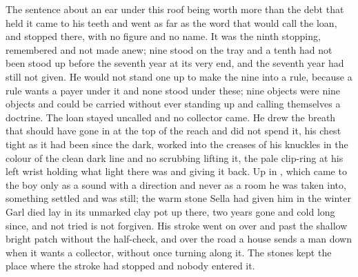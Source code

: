 The sentence about an ear under this roof being worth more than the debt that held it came to his teeth and went as far as the word that would call the loan, and stopped there, with no figure and no name. It was the ninth stopping, remembered and not made anew; nine stood on the tray and a tenth had not been stood up before the seventh year at its very end, and the seventh year had still not given. He would not stand one up to make the nine into a rule, because a rule wants a payer under it and none stood under these; nine objects were nine objects and could be carried without ever standing up and calling themselves a doctrine. The loan stayed uncalled and no collector came. He drew the breath that should have gone in at the top of the reach and did not spend it, his chest tight as it had been since the dark,  worked into the creases of his knuckles in the colour of the clean dark line and no scrubbing lifting it, the pale clip-ring at his left wrist holding what light there was and giving it back. Up in , which came to the boy only as a sound with a direction and never as a room he was taken into, something settled and was still; the warm stone Sella had given him in the winter Garl died lay in its unmarked clay pot up there, two years gone and cold long since, and not tried is not forgiven. His stroke went on over  and past the shallow bright patch without the half-check, and over the road a house sends a man down when it wants a collector, without once turning along it. The stones kept the place where the stroke had stopped and nobody entered it.

\scenebreak

